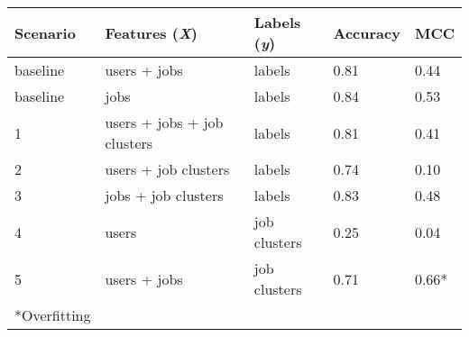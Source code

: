 \begin{tabular}{lllll}
\toprule
\textbf{Scenario}   & \textbf{Features (\textit{X})}    & \textbf{Labels (\textit{y})}  & \textbf{Accuracy} & \textbf{MCC}        \\
\midrule
baseline            & users + jobs                      & labels                        & 0.81              & 0.44            \\
baseline            & jobs                              & labels                        & 0.84              & 0.53            \\
\midrule
1                   & users + jobs + job clusters       & labels                        & 0.81              & 0.41            \\ %
2                   & users + job clusters              & labels                        & 0.74              & 0.10            \\ %
3                   & jobs + job clusters               & labels                        & 0.83              & 0.48            \\ %
4                   & users                             & job clusters                  & 0.25              & 0.04            \\ %
5                   & users + jobs                      & job clusters                  & 0.71              & 0.66*            \\ %
\bottomrule
\tiny{*Overfitting}
\end{tabular}
